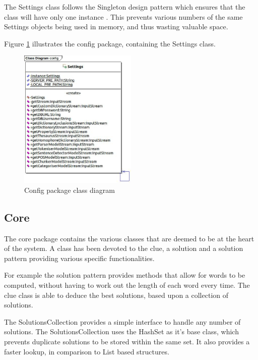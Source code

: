 The Settings class follows the Singleton design pattern which ensures that the 
class will have only one instance \citep{gof}. This prevents various numbers of
the same Settings objects being used in memory, and thus wasting valuable space.

Figure \ref{fig:config_package} illustrates the config package, containing the 
Settings class.

\begin{figure}[H]
  \centering
  \includegraphics[width=0.5\textwidth]{class/config.jpg}
  \caption{Config package class diagram}
  \label{fig:config_package}
\end{figure}


\subsection{Core}
\label{sub:core}

The core package contains the various classes that are deemed to be at the heart
of the system. A class has been devoted to the clue, a solution and a solution 
pattern providing various specific functionalities.

For example the solution pattern provides methods that allow for words to be 
computed, without having to work out the length of each word every time. The 
clue class is able to deduce the best solutions, based upon a collection of 
solutions.

The SolutionsCollection provides a simple interface to handle any number of 
solutions. The SolutionsCollection uses the HashSet as it's base class, which 
prevents duplicate solutions to be stored within the same set. It also provides
a faster lookup, in comparison to List based structures.


